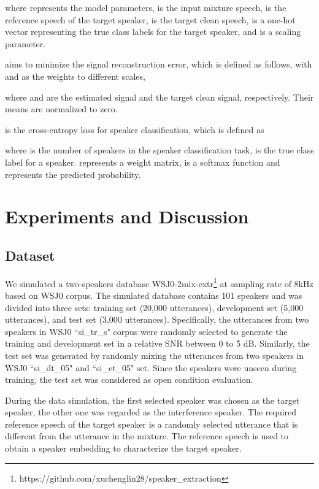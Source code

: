 \documentclass[a4paper]{article}
\begin{document}
where  represents the model parameters,  is the input mixture speech,  is the reference speech of the target speaker,  is the target clean speech,  is a one-hot vector representing the true class labels for the target speaker, and  is a scaling parameter.

 aims to minimize the signal reconstruction error, which is defined as follows, with  and  as the weights to different scales,

where  and  are the estimated signal and the target clean signal, respectively. Their means are normalized to zero. 

 is the cross-entropy loss for speaker classification, which is defined as

where  is the number of speakers in the speaker classification task,  is the true class label for a speaker.  represents a weight matrix,  is a softmax function and  represents the predicted probability.














\section{Experiments and Discussion}

\subsection{Dataset}

We simulated a two-speakers database WSJ0-2mix-extr\footnote{https://github.com/xuchenglin28/speaker\_extraction} at sampling rate of 8kHz based on WSJ0 corpus. The simulated database contains 101 speakers and was divided into three sets: training set (20,000 utterances), development set (5,000 utterances), and test set (3,000 utterances). Specifically, the utterances from two speakers in WSJ0 ``si\_tr\_s" corpus were randomly selected to generate the training and development set in a relative SNR between 0 to 5 dB. Similarly, the test set was generated by randomly mixing the utterances from two speakers in WSJ0 ``si\_dt\_05" and ``si\_et\_05" set. Since the speakers were unseen during training, the test set was considered as open condition evaluation. 

During the data simulation, the first selected speaker was chosen as the target speaker, the other one was regarded as the interference speaker. The required reference speech of the target speaker is a randomly selected utterance that is different from the utterance in the mixture. The reference speech is used to obtain a speaker embedding to characterize the target speaker.
\end{document}
